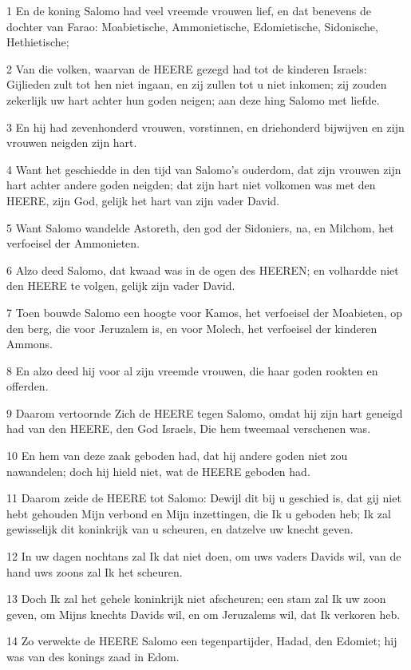 \par 1 En de koning Salomo had veel vreemde vrouwen lief, en dat benevens de dochter van Farao: Moabietische, Ammonietische, Edomietische, Sidonische, Hethietische;
\par 2 Van die volken, waarvan de HEERE gezegd had tot de kinderen Israels: Gijlieden zult tot hen niet ingaan, en zij zullen tot u niet inkomen; zij zouden zekerlijk uw hart achter hun goden neigen; aan deze hing Salomo met liefde.
\par 3 En hij had zevenhonderd vrouwen, vorstinnen, en driehonderd bijwijven en zijn vrouwen neigden zijn hart.
\par 4 Want het geschiedde in den tijd van Salomo's ouderdom, dat zijn vrouwen zijn hart achter andere goden neigden; dat zijn hart niet volkomen was met den HEERE, zijn God, gelijk het hart van zijn vader David.
\par 5 Want Salomo wandelde Astoreth, den god der Sidoniers, na, en Milchom, het verfoeisel der Ammonieten.
\par 6 Alzo deed Salomo, dat kwaad was in de ogen des HEEREN; en volhardde niet den HEERE te volgen, gelijk zijn vader David.
\par 7 Toen bouwde Salomo een hoogte voor Kamos, het verfoeisel der Moabieten, op den berg, die voor Jeruzalem is, en voor Molech, het verfoeisel der kinderen Ammons.
\par 8 En alzo deed hij voor al zijn vreemde vrouwen, die haar goden rookten en offerden.
\par 9 Daarom vertoornde Zich de HEERE tegen Salomo, omdat hij zijn hart geneigd had van den HEERE, den God Israels, Die hem tweemaal verschenen was.
\par 10 En hem van deze zaak geboden had, dat hij andere goden niet zou nawandelen; doch hij hield niet, wat de HEERE geboden had.
\par 11 Daarom zeide de HEERE tot Salomo: Dewijl dit bij u geschied is, dat gij niet hebt gehouden Mijn verbond en Mijn inzettingen, die Ik u geboden heb; Ik zal gewisselijk dit koninkrijk van u scheuren, en datzelve uw knecht geven.
\par 12 In uw dagen nochtans zal Ik dat niet doen, om uws vaders Davids wil, van de hand uws zoons zal Ik het scheuren.
\par 13 Doch Ik zal het gehele koninkrijk niet afscheuren; een stam zal Ik uw zoon geven, om Mijns knechts Davids wil, en om Jeruzalems wil, dat Ik verkoren heb.
\par 14 Zo verwekte de HEERE Salomo een tegenpartijder, Hadad, den Edomiet; hij was van des konings zaad in Edom.
